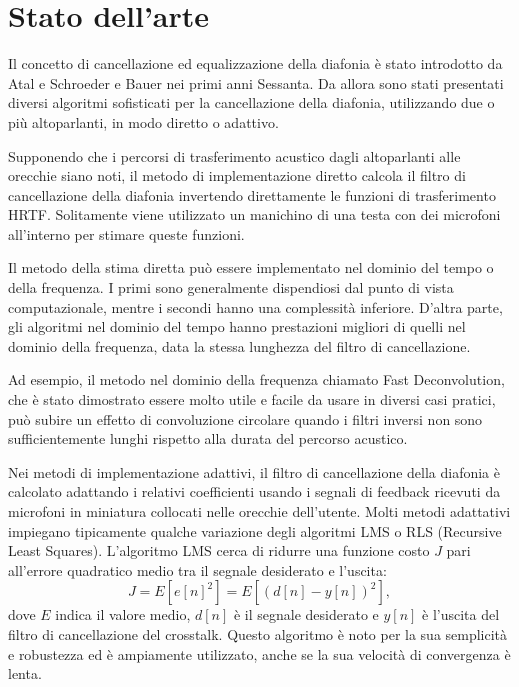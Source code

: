 \documentclass[12pt,a4paper,titlepage]{article}
\begin{document}
\section{Stato dell'arte}
\label{sec:Stato_arte}    
Il concetto di cancellazione ed equalizzazione della diafonia è stato introdotto da Atal e Schroeder e Bauer nei primi anni Sessanta. Da allora sono stati presentati diversi algoritmi sofisticati per la cancellazione della diafonia, utilizzando due o più altoparlanti, in modo diretto o adattivo. 


Supponendo che i percorsi di trasferimento acustico dagli altoparlanti alle orecchie siano noti, il metodo di implementazione diretto calcola il filtro di cancellazione della diafonia invertendo direttamente le funzioni di trasferimento HRTF. Solitamente viene utilizzato un manichino di una testa con dei microfoni all'interno per stimare queste funzioni.

Il metodo della stima diretta può essere implementato nel dominio del tempo o della frequenza. I primi sono generalmente dispendiosi dal punto di vista computazionale, mentre i secondi hanno una complessità inferiore. D'altra parte, gli algoritmi nel dominio del tempo hanno prestazioni migliori di quelli nel dominio della frequenza, data la stessa lunghezza del filtro di cancellazione.

Ad esempio, il metodo nel dominio della frequenza chiamato Fast Deconvolution, che è stato dimostrato essere molto utile e facile da usare in diversi casi pratici, può subire un effetto di convoluzione circolare quando i filtri inversi non sono sufficientemente lunghi rispetto alla durata del percorso acustico.

Nei metodi di implementazione adattivi, il filtro di cancellazione della  diafonia è calcolato adattando i relativi coefficienti usando i segnali di feedback ricevuti da microfoni in miniatura collocati nelle orecchie dell'utente. Molti metodi adattativi impiegano tipicamente qualche variazione degli algoritmi LMS o RLS (Recursive Least Squares). L'algoritmo LMS cerca di ridurre una funzione costo $J$ pari all'errore quadratico medio tra il segnale desiderato e l'uscita:
\begin{equation*}
J=E[e[n]^2]=E[(d[n]-y[n])^2],
\end{equation*}
dove $E$ indica il valore medio, $d[n]$ è il segnale desiderato e $y[n]$ è l'uscita del filtro di cancellazione del crosstalk. Questo algoritmo è noto per la sua semplicità e robustezza ed è ampiamente utilizzato, anche se la sua velocità di convergenza è lenta. 
\end{document}
